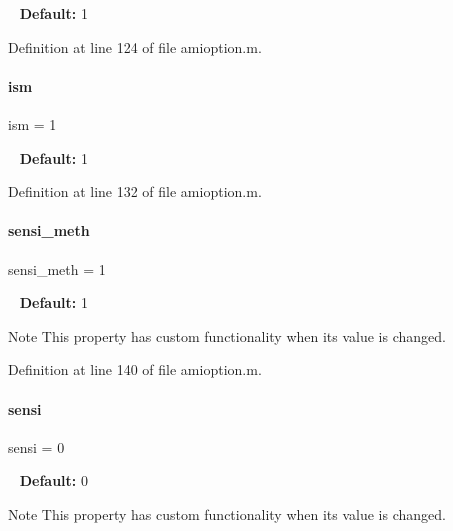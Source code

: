 ~\newline
{\bfseries Default\+:} 1 

Definition at line 124 of file amioption.\+m.

\mbox{\label{classamioption_aada9d6834569ad5c542cb8dc6b26ea46}} 
\paragraph{\texorpdfstring{ism}{ism}}
{\footnotesize\ttfamily ism = 1}

~\newline
{\bfseries Default\+:} 1 

Definition at line 132 of file amioption.\+m.

\mbox{\label{classamioption_ab31e219eb42bc06629c3f247a01b9906}} 
\paragraph{\texorpdfstring{sensi\+\_\+meth}{sensi\_meth}}
{\footnotesize\ttfamily sensi\+\_\+meth = 1}

~\newline
{\bfseries Default\+:} 1

\begin{DoxyNote}{Note}
This property has custom functionality when its value is changed. 
\end{DoxyNote}


Definition at line 140 of file amioption.\+m.

\mbox{\label{classamioption_a7dd31d33463c5a709251bcef0eccaa36}} 
\paragraph{\texorpdfstring{sensi}{sensi}}
{\footnotesize\ttfamily sensi = 0}

~\newline
{\bfseries Default\+:} 0

\begin{DoxyNote}{Note}
This property has custom functionality when its value is changed. 
\end{DoxyNote}



